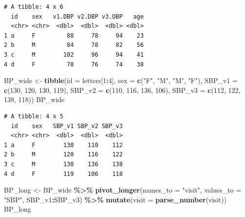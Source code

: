\documentclass[
]{book}
\newenvironment{Shaded}{\begin{snugshade}}{\end{snugshade}}
\newcommand{\AttributeTok}[1]{\textcolor[rgb]{0.13,0.29,0.53}{#1}}
\newcommand{\DecValTok}[1]{\textcolor[rgb]{0.00,0.00,0.81}{#1}}
\newcommand{\FunctionTok}[1]{\textcolor[rgb]{0.13,0.29,0.53}{\textbf{#1}}}
\newcommand{\NormalTok}[1]{#1}
\newcommand{\OtherTok}[1]{\textcolor[rgb]{0.56,0.35,0.01}{#1}}
\newcommand{\SpecialCharTok}[1]{\textcolor[rgb]{0.81,0.36,0.00}{\textbf{#1}}}
\newcommand{\StringTok}[1]{\textcolor[rgb]{0.31,0.60,0.02}{#1}}
\begin{document}
\begin{verbatim}
# A tibble: 4 x 6
  id    sex   v1.DBP v2.DBP v3.DBP   age
  <chr> <chr>  <dbl>  <dbl>  <dbl> <dbl>
1 a     F         88     78     94    23
2 b     M         84     78     82    56
3 c     M        102     96     94    41
4 d     F         70     76     74    38
\end{verbatim}

\begin{Shaded}
\begin{Highlighting}[]
\NormalTok{BP\_wide }\OtherTok{\textless{}{-}} \FunctionTok{tibble}\NormalTok{(}\AttributeTok{id =}\NormalTok{ letters[}\DecValTok{1}\SpecialCharTok{:}\DecValTok{4}\NormalTok{],}
                     \AttributeTok{sex =} \FunctionTok{c}\NormalTok{(}\StringTok{"F"}\NormalTok{, }\StringTok{"M"}\NormalTok{, }\StringTok{"M"}\NormalTok{, }\StringTok{"F"}\NormalTok{),}
                     \AttributeTok{SBP\_v1 =} \FunctionTok{c}\NormalTok{(}\DecValTok{130}\NormalTok{, }\DecValTok{120}\NormalTok{, }\DecValTok{130}\NormalTok{, }\DecValTok{119}\NormalTok{),}
                     \AttributeTok{SBP\_v2 =} \FunctionTok{c}\NormalTok{(}\DecValTok{110}\NormalTok{, }\DecValTok{116}\NormalTok{, }\DecValTok{136}\NormalTok{, }\DecValTok{106}\NormalTok{),}
                     \AttributeTok{SBP\_v3 =} \FunctionTok{c}\NormalTok{(}\DecValTok{112}\NormalTok{, }\DecValTok{122}\NormalTok{, }\DecValTok{138}\NormalTok{, }\DecValTok{118}\NormalTok{))}
\NormalTok{BP\_wide}
\end{Highlighting}
\end{Shaded}

\begin{verbatim}
# A tibble: 4 x 5
  id    sex   SBP_v1 SBP_v2 SBP_v3
  <chr> <chr>  <dbl>  <dbl>  <dbl>
1 a     F        130    110    112
2 b     M        120    116    122
3 c     M        130    136    138
4 d     F        119    106    118
\end{verbatim}

\begin{Shaded}
\begin{Highlighting}[]
\NormalTok{BP\_long }\OtherTok{\textless{}{-}}\NormalTok{ BP\_wide }\SpecialCharTok{\%\textgreater{}\%} 
  \FunctionTok{pivot\_longer}\NormalTok{(}\AttributeTok{names\_to =} \StringTok{"visit"}\NormalTok{, }\AttributeTok{values\_to =} \StringTok{"SBP"}\NormalTok{, SBP\_v1}\SpecialCharTok{:}\NormalTok{SBP\_v3) }\SpecialCharTok{\%\textgreater{}\%} 
  \FunctionTok{mutate}\NormalTok{(}\AttributeTok{visit =} \FunctionTok{parse\_number}\NormalTok{(visit))}
\NormalTok{BP\_long}
\end{Highlighting}
\end{Shaded}
\end{document}
